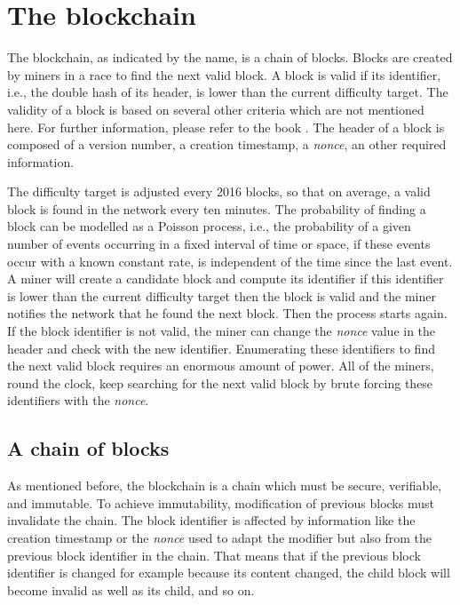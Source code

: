 \newpage

\section{The blockchain}

The blockchain, as indicated by the name, is a chain of blocks. Blocks are
created by miners in a race to find the next valid block. A block is valid if its identifier, i.e., the double hash of its
header, is lower than the current difficulty target. The
validity of a block is based on several other criteria which are not mentioned
here.  For further information, please refer to the book .
The header of a block is composed of a version number, a creation timestamp, a
\textit{nonce}, an other required information.

The difficulty target is adjusted every 2016 blocks, so that on average, a valid
block is found in the network every ten minutes. The probability of finding a block can be modelled as a Poisson process,
i.e., the probability of a given number of events occurring in a fixed interval
of time or space, if these events occur with a known constant rate, is independent
of the time since the last event. A miner will create a candidate block and
compute its identifier if this identifier is lower than the current difficulty
target then the block is valid and the miner notifies the network that he found
the next block. Then the process starts again. If the block identifier is not
valid, the miner can change the \textit{nonce} value in the header and check with the new
identifier. Enumerating these identifiers to find the next valid block requires an
enormous amount of power. All of the miners, round the clock, keep searching for
the next valid block by brute forcing these identifiers with the \textit{nonce}.

\subsection{A chain of blocks}

As mentioned before, the blockchain is a chain which must be secure, verifiable,
and immutable. To achieve immutability, modification of previous blocks must
invalidate the chain. The block identifier is affected by information like the
creation timestamp or the \textit{nonce} used to adapt the modifier but also from the
previous block identifier in the chain. That means that if the previous block
identifier is changed for example because its content changed, the child block
will become invalid as well as its child, and so on.

